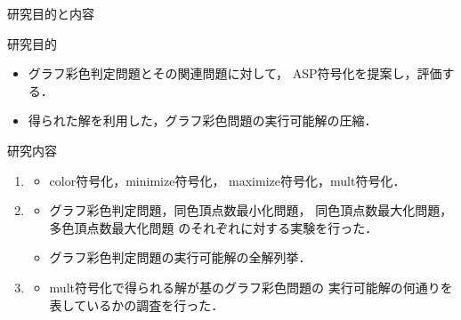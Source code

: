 \documentclass[dvipdfmx,11pt]{beamer}
\begin{document}
\begin{frame}{研究目的と内容}

 \begin{alertblock}{研究目的}%
  \begin{itemize}
   \item グラフ彩色判定問題とその関連問題に対して，
         ASP符号化を提案し，評価する．
   \item 得られた解を利用した，グラフ彩色問題の実行可能解の圧縮．
  \end{itemize}

 \end{alertblock}

 \begin{block}{研究内容}
  \begin{enumerate}
   \item {}
         \begin{itemize}
          \item color符号化，minimize符号化，
                maximize符号化，mult符号化．
         \end{itemize}
   \item {}
         \begin{itemize}
          \item グラフ彩色判定問題，同色頂点数最小化問題，
		同色頂点数最大化問題，多色頂点数最大化問題
		のそれぞれに対する実験を行った．
	  \item グラフ彩色判定問題の実行可能解の全解列挙．%
         \end{itemize}
   \item {}
         \begin{itemize}
          \item mult符号化で得られる解が基のグラフ彩色問題の
                実行可能解の何通りを表しているかの調査を行った．
         \end{itemize}
  \end{enumerate}
 \end{block}
 
\end{frame}

\end{document}
